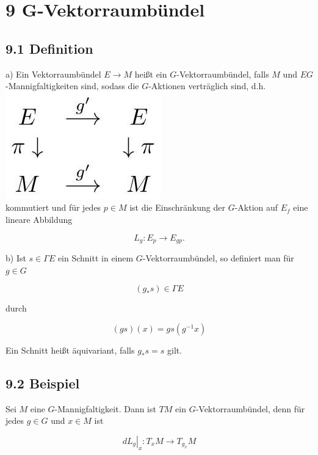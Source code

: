 \documentclass[10pt, letterpaper]{article}
\begin{document}
\section*{9 G-Vektorraumbündel}
\subsection*{9.1 Definition}
a) Ein Vektorraumbündel $E \rightarrow M$ heißt ein $G$-Vektorraumbündel, falls $M$ und $E G$-Mannigfaltigkeiten sind, sodass die $G$-Aktionen verträglich sind, d.h.\\
\includegraphics[max width=\textwidth, center]{2025_05_20_67e75debbfd3ba8ea587g-51}\\
kommutiert und für jedes $p \in M$ ist die Einschränkung der $G$-Aktion auf $E_{f}$ eine lineare Abbildung

$$
L_{g}: E_{p} \rightarrow E_{g p} .
$$

b) Ist $s \in \Gamma E$ ein Schnitt in einem $G$-Vektorraumbündel, so definiert man für $g \in G$

$$
\left(g_{*} s\right) \in \Gamma E
$$

durch

$$
(g s)(x)=g s\left(g^{-1} x\right)
$$

Ein Schnitt heißt äquivariant, falls $g_{*} s=s$ gilt.

\subsection*{9.2 Beispiel}
Sei $M$ eine $G$-Mannigfaltigkeit. Dann ist $T M$ ein $G$-Vektorraumbündel, denn für jedes $g \in G$ und $x \in M$ ist

$$
\left.d L_{g}\right|_{x}: T_{x} M \rightarrow T_{g_{x}} M
$$
\end{document}
